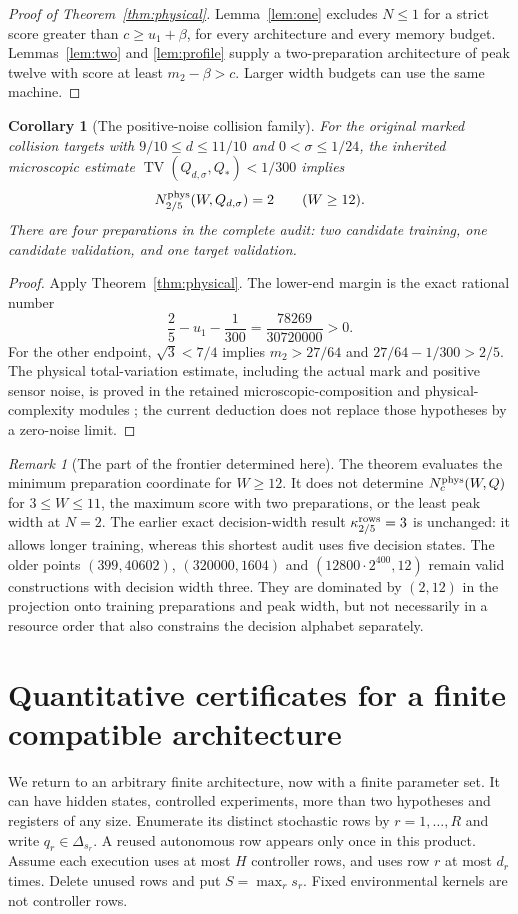 \documentclass[11pt]{amsart}
\newtheorem{corollary}[theorem]{Corollary}
\theoremstyle{definition}\newtheorem{definition}[theorem]{Definition}
\theoremstyle{remark}\newtheorem{remark}[theorem]{Remark}
\newcommand{\TV}{\operatorname{TV}}
\newcommand{\1}{\mathbf 1}
\newcommand{\Qstar}{Q_*}
\begin{document}
\begin{proof}[Proof of Theorem~\ref{thm:physical}]
Lemma~\ref{lem:one} excludes $N\le1$ for a strict score greater than
$c\ge u_1+\beta$, for every architecture and every memory budget.
Lemmas~\ref{lem:two} and \ref{lem:profile} supply a two-preparation
architecture of peak twelve with score at least $m_2-\beta>c$.
Larger width budgets can use the same machine.
\end{proof}

\begin{corollary}[The positive-noise collision family]\label{cor:collision}
For the original marked collision targets with
$9/10\le d\le11/10$ and $0<\sigma\le1/24$, the inherited microscopic
estimate $\TV(Q_{d,\sigma},\Qstar)<1/300$ implies
\[
             N_{2/5}^{\rm phys}(W,Q_{d,\sigma})=2
                         \qquad(W\ge12).
\]
There are four preparations in the complete audit: two candidate training,
one candidate validation, and one target validation.
\end{corollary}
\begin{proof}
Apply Theorem~\ref{thm:physical}. The lower-end margin is the exact rational
number
\[
 \frac25-u_1-\frac1{300}=\frac{78269}{30720000}>0.
\]
For the other endpoint, $\sqrt3<7/4$ implies
$m_2>27/64$ and $27/64-1/300>2/5$.
The physical total-variation estimate, including the actual mark and
positive sensor noise, is proved in the retained microscopic-composition
and physical-complexity modules \cite{Companion}; the current deduction
does not replace those hypotheses by a zero-noise limit.
\end{proof}

\begin{remark}[The part of the frontier determined here]
The theorem evaluates the minimum preparation coordinate for $W\ge12$.
It does not determine $N_c^{\rm phys}(W,Q)$ for $3\le W\le11$, the
maximum score with two preparations, or the least peak width at $N=2$.
The earlier exact decision-width result $\kappa_{2/5}^{\rm rows}=3$
is unchanged: it allows longer training, whereas this shortest audit
uses five decision states. The older points $(399,40602)$,
$(320000,1604)$ and $(12800\cdot2^{400},12)$ remain valid constructions
with decision width three. They are dominated by $(2,12)$ in the
projection onto training preparations and peak width, but not necessarily
in a resource order that also constrains the decision alphabet separately.
\end{remark}

\section{Quantitative certificates for a finite compatible architecture}
\label{sec:quantitative}
We return to an arbitrary finite architecture, now with a finite parameter
set. It can have hidden states, controlled experiments, more than two
hypotheses and registers of any size. Enumerate its distinct stochastic
rows by $r=1,\ldots,R$ and write $q_r\in\Delta_{s_r}$.
A reused autonomous row appears only once in this product. Assume each
execution uses at most $H$ controller rows, and uses row $r$ at most $d_r$
times. Delete unused rows and put $S=\max_rs_r$.
Fixed environmental kernels are not controller rows.
\end{document}
